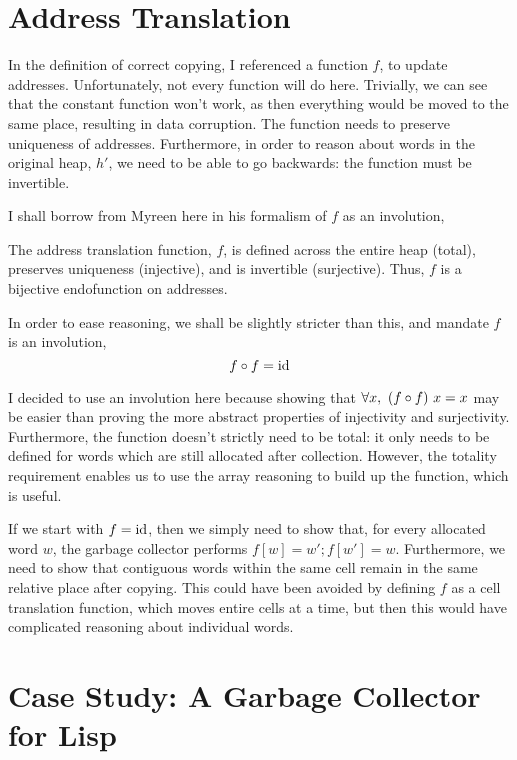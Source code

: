 \section{Address Translation}
\label{sec:copying-address}

In the definition of correct \gls{copying}, I referenced a function
$f$, to update addresses. Unfortunately, not every function will do
here. Trivially, we can see that the constant function won't work, as
then everything would be moved to the same place, resulting in data
corruption. The function needs to preserve uniqueness of
addresses. Furthermore, in order to reason about words in the original
\gls{heap}, $h'$, we need to be able to go backwards: the function
must be invertible.

I shall borrow from Myreen\cite{Myreen10} here in his formalism of $f$
as an involution,

\begin{definition}
  \label{def:c-address-translation-function}
  The address translation function, $f$, is defined across the entire
  heap (total), preserves uniqueness (injective), and is invertible
  (surjective). Thus, $f$ is a bijective endofunction on addresses.

  In order to ease reasoning, we shall be slightly stricter than this,
  and mandate $f$ is an involution, \[f \circ f = \mathrm{id}\]
\end{definition}

I decided to use an involution here because showing that $\forall x,\
(f \circ f)~x = x$ may be easier than proving the more abstract
properties of injectivity and surjectivity. Furthermore, the function
doesn't strictly need to be total: it only needs to be defined for
words which are still allocated after collection. However, the
totality requirement enables us to use the array reasoning to build up
the function, which is useful.

If we start with $f = \mathrm{id}$, then we simply need to show that, for
every allocated word $w$, the \gls{garbage collector} performs $f[w] =
w'; f[w'] = w$. Furthermore, we need to show that contiguous words
within the same \gls{cell} remain in the same relative place after
copying. This could have been avoided by defining $f$ as a cell
translation function, which moves entire cells at a time, but then
this would have complicated reasoning about individual words.

\section{Case Study: A Garbage Collector for Lisp}
\label{sec:copying-example}

